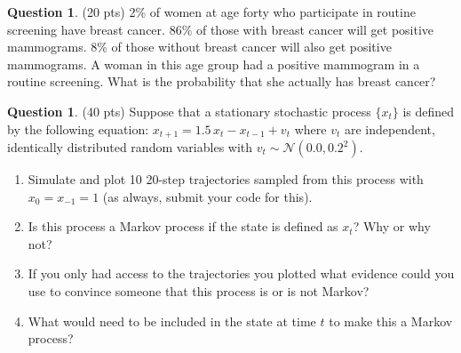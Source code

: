 \documentclass{article}
\theoremstyle{definition}
\newtheorem{question}[thm]{Question}
\begin{document}

\begin{question} (20 pts)
    2\% of women at age forty who participate in routine screening have breast cancer. 86\% of those with breast cancer will get positive mammograms. 8\% of those without breast cancer will also get positive mammograms. A woman in this age group had a positive mammogram in a routine screening. What is the probability that she actually has breast cancer?
\end{question}

\begin{question} (40 pts)
Suppose that a stationary stochastic process $\{x_t\}$ is defined by the following equation: $x_{t+1} = 1.5 \, x_t - x_{t-1} + v_{t}$ where $v_t$ are independent, identically distributed random variables with $v_t \sim \mathcal{N}(0.0, 0.2^2)$.
    \begin{enumerate}[nosep,label=(\alph*)]
        \item Simulate and plot 10 20-step trajectories sampled from this process with $x_0 = x_{-1} = 1$ (as always, submit your code for this).
        \item Is this process a Markov process if the state is defined as $x_t$? Why or why not?
        \item If you only had access to the trajectories you plotted what evidence could you use to convince someone that this process is or is not Markov?
        \item What would need to be included in the state at time $t$ to make this a Markov process?
    \end{enumerate}
\end{question}
\end{document}

